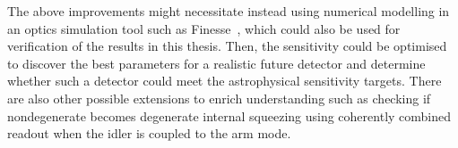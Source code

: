 The above improvements might necessitate instead using numerical modelling in an optics simulation tool such as Finesse~\cite{}, which could also be used for verification of the results in this thesis. %
Then, the sensitivity could be optimised to discover the best parameters for a realistic future detector and determine whether such a detector could meet the astrophysical sensitivity targets. %
There are also other possible extensions to enrich understanding such as checking if nondegenerate becomes degenerate internal squeezing using coherently combined readout when the idler is coupled to the arm mode.






